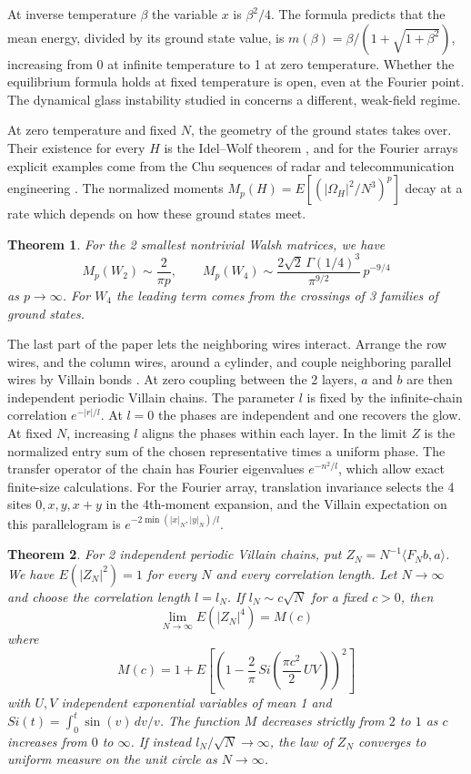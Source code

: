 \documentclass[11pt,a4paper]{article}
\newtheorem{introthm}{Theorem}
\theoremstyle{remark}
\begin{document}
At inverse temperature $\beta$ the variable $x$ is $\beta^2/4$. The formula predicts that the mean energy, divided by its ground state value, is $m(\beta)=\beta/(1+\sqrt{1+\beta^2})$, increasing from 0 at infinite temperature to 1 at zero temperature. Whether the equilibrium formula holds at fixed temperature is open, even at the Fourier point. The dynamical glass instability studied in \cite{cfi,cis} concerns a different, weak-field regime.

At zero temperature and fixed $N$, the geometry of the ground states takes over. Their existence for every $H$ is the Idel--Wolf theorem \cite{iwo}, and for the Fourier arrays explicit examples come from the Chu sequences of radar and telecommunication engineering \cite{chu,fza}. The normalized moments $M_p(H)=E[(|\Omega_H|^2/N^3)^p]$ decay at a rate which depends on how these ground states meet.

\begin{samepage}
\begin{introthm}\label{intro:edge}
For the 2 smallest nontrivial Walsh matrices, we have
\[
 M_p(W_2)\sim\frac{2}{\pi p},\qquad
 M_p(W_4)\sim\frac{2\sqrt2\,\Gamma(1/4)^3}{\pi^{9/2}}\,p^{-9/4}
\]
as $p\to\infty$. For $W_4$ the leading term comes from the crossings of 3 families of ground states.
\end{introthm}
\end{samepage}

The last part of the paper lets the neighboring wires interact. Arrange the row wires, and the column wires, around a cylinder, and couple neighboring parallel wires by Villain bonds \cite{villain}. At zero coupling between the 2 layers, $a$ and $b$ are then independent periodic Villain chains. The parameter $l$ is fixed by the infinite-chain correlation $e^{-|r|/l}$. At $l=0$ the phases are independent and one recovers the glow. At fixed $N$, increasing $l$ aligns the phases within each layer. In the limit $Z$ is the normalized entry sum of the chosen representative times a uniform phase. The transfer operator of the chain has Fourier eigenvalues $e^{-n^2/l}$, which allow exact finite-size calculations. For the Fourier array, translation invariance selects the 4 sites $0,x,y,x+y$ in the 4th-moment expansion, and the Villain expectation on this parallelogram is $e^{-2\min(|x|_N,|y|_N)/l}$.

\begin{samepage}
\begin{introthm}\label{intro:fourier}
For 2 independent periodic Villain chains, put $Z_N=N^{-1}\langle F_Nb,a\rangle$. We have $E(|Z_N|^2)=1$ for every $N$ and every correlation length. Let $N\to\infty$ and choose the correlation length $l=l_N$. If $l_N\sim c\sqrt N$ for a fixed $c>0$, then
\[
 \lim_{N\to\infty}E(|Z_N|^4)=M(c)
\]
where
\[
 M(c)=1+E\left[
 \left(1-\frac2\pi\, Si\left(\frac{\pi c^2}{2}\,UV\right)\right)^2\right]
\]
with $U,V$ independent exponential variables of mean 1 and $Si(t)=\int_0^t\sin(v)\,dv/v$. The function $M$ decreases strictly from $2$ to $1$ as $c$ increases from $0$ to $\infty$. If instead $l_N/\sqrt N\to\infty$, the law of $Z_N$ converges to uniform measure on the unit circle as $N\to\infty$.
\end{introthm}
\end{samepage}
\end{document}
